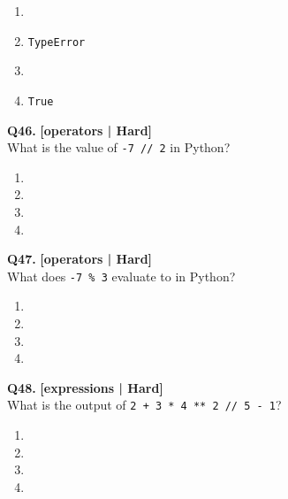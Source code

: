 \begin{enumerate}[label=(\alph*),topsep=2pt,itemsep=1pt,partopsep=0pt,parsep=0pt]
    \item {}
    \item \relax \texttt{TypeError}
    \item {}
    \item \relax \texttt{True}
\end{enumerate}
\vspace{2mm}

\noindent\textbf{Q46.} \hfill {\small\color{LPUOrange}\textbf{[operators | Hard]}}\\[2pt]
What is the value of \texttt{-7 // 2} in Python?

\begin{enumerate}[label=(\alph*),topsep=2pt,itemsep=1pt,partopsep=0pt,parsep=0pt]
    \item {}
    \item {}
    \item {}
    \item {}
\end{enumerate}
\vspace{2mm}

\noindent\textbf{Q47.} \hfill {\small\color{LPUOrange}\textbf{[operators | Hard]}}\\[2pt]
What does \texttt{-7 \% 3} evaluate to in Python?

\begin{enumerate}[label=(\alph*),topsep=2pt,itemsep=1pt,partopsep=0pt,parsep=0pt]
    \item {}
    \item {}
    \item {}
    \item {}
\end{enumerate}
\vspace{2mm}

\noindent\textbf{Q48.} \hfill {\small\color{LPUOrange}\textbf{[expressions | Hard]}}\\[2pt]
What is the output of \texttt{2 + 3 * 4 ** 2 // 5 - 1}?

\begin{enumerate}[label=(\alph*),topsep=2pt,itemsep=1pt,partopsep=0pt,parsep=0pt]
    \item {}
    \item {}
    \item {}
    \item {}
\end{enumerate}
\vspace{2mm}

